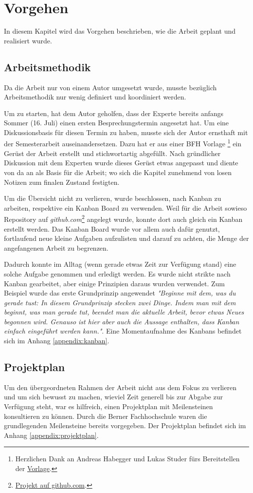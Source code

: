 \section{Vorgehen}
In diesem Kapitel wird das Vorgehen beschrieben, wie die Arbeit geplant und realisiert wurde.

\subsection{Arbeitsmethodik}
Da die Arbeit nur von einem Autor umgesetzt wurde, musste bezüglich Arbeitsmethodik nur wenig definiert und koordiniert werden.

Um zu starten, hat dem Autor geholfen, dass der Experte \prof\space bereits anfangs Sommer (16. Juli) einen ersten Besprechungstermin angesetzt hat. Um eine Diskussionsbasis für diesen Termin zu haben, musste sich der Autor ernsthaft mit der Semesterarbeit auseinandersetzen. Dazu hat er aus einer BFH Vorlage \footnote{Herzlichen Dank an Andreas Habegger und Lukas Studer fürs Bereitstellen der \href{https://gitlab.ti.bfh.ch/latex-utils/tpl_latex-thesis}{Vorlage}.} ein Gerüst der Arbeit erstellt und stichwortartig abgefüllt. Nach gründlicher Diskussion mit dem Experten wurde dieses Gerüst etwas angepasst und diente von da an als Basis für die Arbeit; wo sich die Kapitel zunehmend von losen Notizen zum finalen Zustand festigten.

Um die Übersicht nicht zu verlieren, wurde beschlossen, nach Kanban zu arbeiten, respektive ein Kanban Board zu verwenden. Weil für die Arbeit sowieso Repository auf \emph{github.com}\footnote{\href{https://github.com/bfh-semesterarbeit/spot-geoprocessing/projects/1}{Projekt auf github.com}.} angelegt wurde, konnte dort auch gleich ein Kanban erstellt werden. Das Kanban Board wurde vor allem auch dafür genutzt, fortlaufend neue kleine Aufgaben aufzulisten und darauf zu achten, die Menge der angefangenen Arbeit zu begrenzen.

Dadurch konnte im Alltag (wenn gerade etwas Zeit zur Verfügung stand) eine solche Aufgabe genommen und erledigt werden. Es wurde nicht strikte nach Kanban gearbeitet, aber einige Prinzipien daraus wurden verwendet. Zum Beispiel wurde das erste Grundprinzip angewendet \textit{"Beginne mit dem, was du gerade tust:
In diesem Grundprinzip stecken zwei Dinge. Indem man mit dem beginnt, was man gerade tut, beendet man die aktuelle Arbeit, bevor etwas Neues begonnen wird. Genauso ist hier aber auch die Aussage enthalten, dass Kanban einfach eingeführt werden kann."}\cite{kanban2010}. Eine Momentaufnahme des Kanbans befindet sich im Anhang \ref{appendix:kanban}.

\subsection{Projektplan}\label{chap:projektplan}
Um den übergeordneten Rahmen der Arbeit nicht aus dem Fokus zu verlieren und um sich bewusst zu machen, wieviel Zeit generell bis zur Abgabe zur Verfügung steht, war es hilfreich, einen Projektplan mit Meilensteinen konsultieren zu können. Durch die Berner Fachhochschule waren die grundlegenden Meilensteine bereits vorgegeben. Der Projektplan befindet sich im Anhang \ref{appendix:projektplan}.
